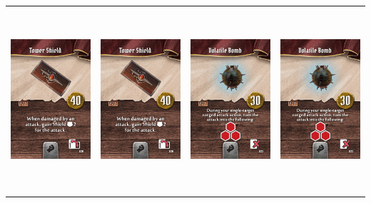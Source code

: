\documentclass{minimal}
\begin{document}
{\begin{longtable}{llll}
\includegraphics[width=44mm,height=68mm]{./29-35/gh-032-tower-shield.png} &
\includegraphics[width=44mm,height=68mm]{./29-35/gh-032-tower-shield.png} &
\includegraphics[width=44mm,height=68mm]{./29-35/gh-033-volatile-bomb.png} &
\includegraphics[width=44mm,height=68mm]{./29-35/gh-033-volatile-bomb.png}\\ 

\end{longtable}}
\end{document}
